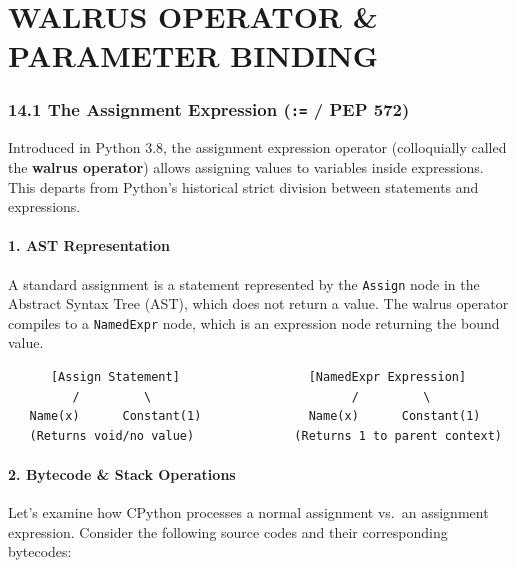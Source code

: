 \hypertarget{walrus-operator-parameter-binding}{%
\chapter{WALRUS OPERATOR \& PARAMETER
BINDING}\label{walrus-operator-parameter-binding}}

\hypertarget{the-assignment-expression-pep-572}{%
\subsection{\texorpdfstring{14.1 The Assignment Expression (\texttt{:=}
/ PEP
572)}{14.1 The Assignment Expression (:= / PEP 572)}}\label{the-assignment-expression-pep-572}}

Introduced in Python 3.8, the assignment expression operator
(colloquially called the \textbf{walrus operator}) allows assigning
values to variables inside expressions. This departs from Python's
historical strict division between statements and expressions.

\hypertarget{ast-representation}{%
\subsubsection{1. AST Representation}\label{ast-representation}}

A standard assignment is a statement represented by the
\passthrough{\lstinline!Assign!} node in the Abstract Syntax Tree (AST),
which does not return a value. The walrus operator compiles to a
\passthrough{\lstinline!NamedExpr!} node, which is an expression node
returning the bound value.

\begin{lstlisting}
      [Assign Statement]                  [NamedExpr Expression]
         /         \                            /         \
   Name(x)      Constant(1)               Name(x)      Constant(1)
   (Returns void/no value)              (Returns 1 to parent context)
\end{lstlisting}

\hypertarget{bytecode-stack-operations}{%
\subsubsection{2. Bytecode \& Stack
Operations}\label{bytecode-stack-operations}}

Let's examine how CPython processes a normal assignment vs.~an
assignment expression. Consider the following source codes and their
corresponding bytecodes:

